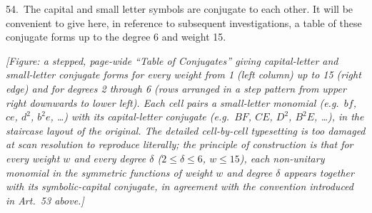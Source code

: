 \documentclass[11pt]{article}
\begin{document}
54.\ The capital and small letter symbols are conjugate to each other. It will be convenient to give here, in reference to subsequent investigations, a table of these conjugate forms up to the degree 6 and weight 15.

\textit{[Figure: a stepped, page-wide ``Table of Conjugates'' giving capital-letter and small-letter conjugate forms for every weight from 1 (left column) up to 15 (right edge) and for degrees 2 through 6 (rows arranged in a step pattern from upper right downwards to lower left). Each cell pairs a small-letter monomial (e.g.\ $bf$, $ce$, $d^2$, $b^2 e$, \ldots) with its capital-letter conjugate (e.g.\ $BF$, $CE$, $D^2$, $B^2 E$, \ldots), in the staircase layout of the original. The detailed cell-by-cell typesetting is too damaged at scan resolution to reproduce literally; the principle of construction is that for every weight $w$ and every degree $\delta$ ($2 \leq \delta \leq 6$, $w \leq 15$), each non-unitary monomial in the symmetric functions of weight $w$ and degree $\delta$ appears together with its symbolic-capital conjugate, in agreement with the convention introduced in Art.\ 53 above.]}
\end{document}
